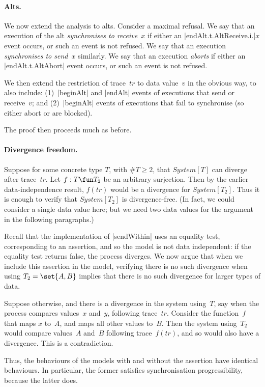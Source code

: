 
\paragraph{Alts.}

We now extend the analysis to alts.  Consider a maximal refusal.  We say that
an execution of the alt \emph{synchronises to receive~$x$} if either an
|endAlt.t.AltReceive.i.|$x$ event occurs, or such an event is not refused.  We
say that an execution \emph{synchronises to send~$x$} similarly.  We say that
an execution \emph{aborts} if either an |endAlt.t.AltAbort| event occurs, or
such an event is not refused.

We then extend the restriction of trace~$tr$ to data value~$v$ in the obvious
way, to also include: (1)~|beginAlt| and |endAlt| events of executions that
send or receive~$v$; and (2)~|beginAlt| events of executions that fail to
synchronise (so either abort or are blocked).

The proof then proceeds much as before.


\paragraph{Divergence freedom.}

Suppose  for some concrete type $T$, with $\#T \ge 2$, that $System[T]$
can diverge after trace~$tr$.  Let $f : T \fun T_2$ be an arbitrary
surjection.  Then by the earlier data-independence result, $f(tr)$ would be a
divergence for $System[T_2]$.  Thus it is enough to verify that $System[T_2]$
is divergence-free.  (In fact, we could consider a single data value here; but
we need two data values for the argument in the following paragraphs.)

Recall that the implementation of |sendWithin| uses an equality test,
corresponding to an assertion, and so the model is not data independent: if
the equality test returns false, the process diverges.  We now argue that when
we include this assertion in the model, verifying there is no such divergence
when using $T_2 = \set{A, B}$ implies that there is no such divergence for
larger types of data.

Suppose otherwise, and there is a divergence in the system using~$T$, say when
the process compares values~$x$ and~$y$, following trace~$tr$.  Consider the
function~$f$ that maps $x$ to~$A$, and maps all other values to~$B$.  Then the
system using~$T_2$ would compare values~$A$ and~$B$ following trace~$f(tr)$,
and so would also have a divergence.  This is a contradiction.

Thus, the behaviours of the models with and without the assertion have
identical behaviours.  In particular, the former satisfies synchronisation
progressibility, because the latter does. 

